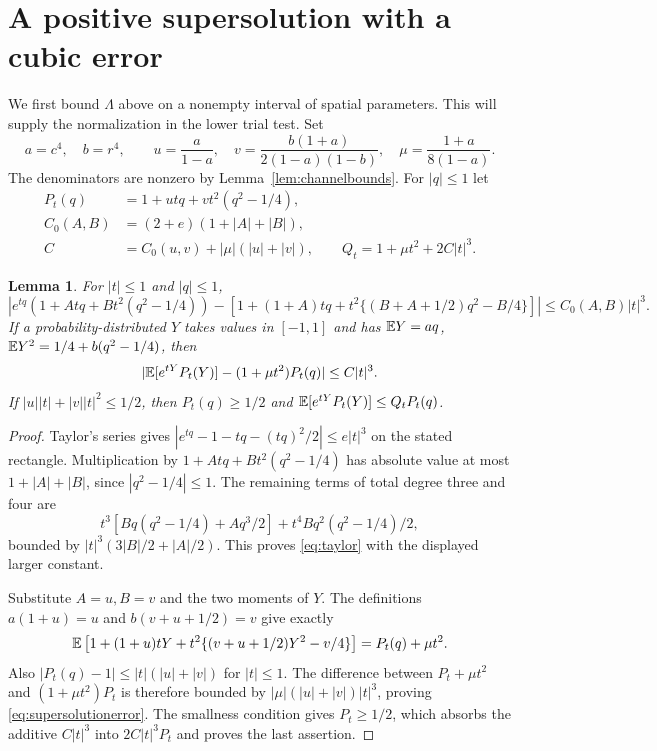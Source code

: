 \documentclass[11pt]{article}
\newtheorem{lemma}[theorem]{Lemma}
\begin{document}
\section{A positive supersolution with a cubic error}
We first bound $\Lambda$ above on a nonempty interval of spatial
parameters. This will supply the normalization in the lower trial test.
Set
\begin{equation}\label{eq:vacuumconstants}
 a=c^4,\quad b=r^4,\qquad
 u=\frac{a}{1-a},\quad
 v=\frac{b(1+a)}{2(1-a)(1-b)},\quad
 \mu=\frac{1+a}{8(1-a)}.
\end{equation}
The denominators are nonzero by Lemma~\ref{lem:channelbounds}.
For $|q|\leq1$ let
\begin{align}
 P_t(q)&=1+utq+vt^2(q^2-1/4),\label{eq:polynomial}\\
 C_0(A,B)&=(2+e)(1+|A|+|B|),\nonumber\\
 C&=C_0(u,v)+|\mu|(|u|+|v|),\qquad
 Q_t=1+\mu t^2+2C|t|^3.\label{eq:certificate}
\end{align}

\begin{lemma}\label{lem:taylor}
For $|t|\leq1$ and $|q|\leq1$,
\begin{equation}\label{eq:taylor}
 \left|e^{tq}(1+Atq+Bt^2(q^2-1/4))
 -\left[1+(1+A)tq+
 t^2\{(B+A+1/2)q^2-B/4\}\right]\right|
 \leq C_0(A,B)|t|^3.
\end{equation}
If a probability-distributed $Y$ takes values in $[-1,1]$ and has
$\mathbb E Y=aq$, $\mathbb E Y^2=1/4+b(q^2-1/4)$, then
\begin{equation}\label{eq:supersolutionerror}
 |\mathbb E[e^{tY}P_t(Y)]-(1+\mu t^2)P_t(q)|\leq C|t|^3.
\end{equation}
If $|u||t|+|v||t|^2\leq1/2$, then $P_t(q)\geq1/2$ and
$\mathbb E[e^{tY}P_t(Y)]\leq Q_tP_t(q)$.
\end{lemma}
\begin{proof}
Taylor's series gives
$|e^{tq}-1-tq-(tq)^2/2|\leq e|t|^3$ on the stated rectangle.
Multiplication by $1+Atq+Bt^2(q^2-1/4)$ has absolute value at most
$1+|A|+|B|$, since $|q^2-1/4|\leq1$. The remaining terms of total
degree three and four are
\[
 t^3[Bq(q^2-1/4)+Aq^3/2]+t^4Bq^2(q^2-1/4)/2,
\]
bounded by $|t|^3(3|B|/2+|A|/2)$. This proves
\eqref{eq:taylor} with the displayed larger constant.

Substitute $A=u,B=v$ and the two moments of $Y$. The definitions
$a(1+u)=u$ and $b(v+u+1/2)=v$ give exactly
\[
 \mathbb E\left[1+(1+u)tY+t^2\{(v+u+1/2)Y^2-v/4\}\right]
 =P_t(q)+\mu t^2.
\]
Also $|P_t(q)-1|\leq|t|(|u|+|v|)$ for $|t|\leq1$.
The difference between $P_t+\mu t^2$ and $(1+\mu t^2)P_t$
is therefore bounded by $|\mu|(|u|+|v|)|t|^3$, proving
\eqref{eq:supersolutionerror}. The smallness condition gives
$P_t\geq1/2$, which absorbs the additive $C|t|^3$ into
$2C|t|^3P_t$ and proves the last assertion.
\end{proof}
\end{document}
